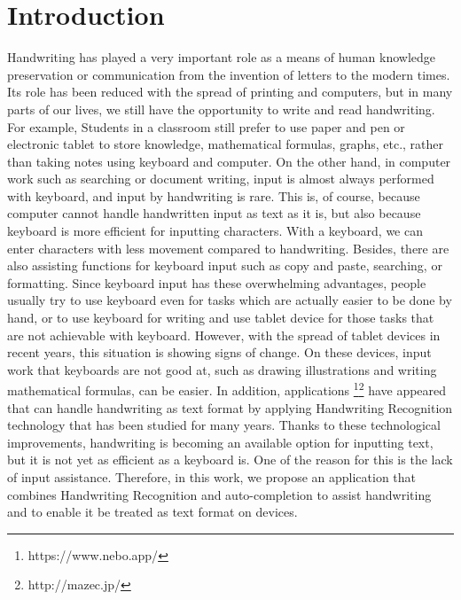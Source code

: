 \section{Introduction}

Handwriting has played a very important role as a means of human knowledge preservation
or communication from the invention of letters to the modern times.
Its role has been reduced with the spread of printing and computers,
but in many parts of our lives, we still have the opportunity to write and read handwriting.
For example, Students in a classroom still prefer to use paper and pen or electronic tablet
to store knowledge, mathematical formulas, graphs, etc.,
rather than taking notes using keyboard and computer.
On the other hand, in computer work such as searching or document writing,
input is almost always performed with keyboard, and input by handwriting is rare.
This is, of course, because computer cannot handle handwritten input as text as it is,
but also because keyboard is more efficient for inputting characters.
With a keyboard, we can enter characters with less movement compared to handwriting.
Besides, there are also assisting functions for keyboard input such as copy and paste,
searching, or formatting. Since keyboard input has these overwhelming advantages,
people usually try to use keyboard even for tasks which are actually easier to be done by hand,
or to use keyboard for writing and use tablet device for those tasks that are not achievable with keyboard.
However, with the spread of tablet devices in recent years, this situation is showing signs of change.
On these devices, input work that keyboards are not good at, such as drawing illustrations and
writing mathematical formulas, can be easier. In addition, applications
\footnote{https://www.nebo.app/}\footnote{http://mazec.jp/} have appeared that can handle handwriting
as text format by applying Handwriting Recognition technology that has been studied for many years.
Thanks to these technological improvements, handwriting is becoming an available option for inputting text,
but it is not yet as efficient as a keyboard is. One of the reason for this is the lack of input assistance.
Therefore, in this work, we propose an application that combines Handwriting Recognition and auto-completion
to assist handwriting and to enable it be treated as text format on devices.

